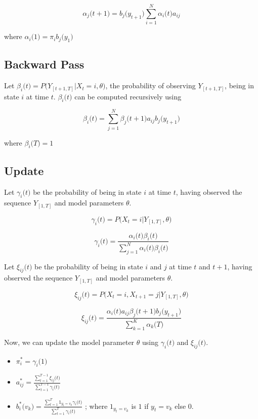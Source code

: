 \documentclass{article} %
\begin{document}
\[\alpha_j\big(t+1\big) = b_j\big(y_{t+1}\big)\sum_{i=1}^N\alpha_i\big(t\big)a_{ij}\]

where $\alpha_i\big(1\big) = \pi_ib_j\big(y_1\big)$

\subsection*{Backward Pass}
Let $\beta_i\big(t\big) = P\big(Y_{[t+1,T]}|X_t=i,\theta\big)$, the probability of observing  $Y_{[t+1,T]}$, being in state $i$ at time $t$. $\beta_i\big(t\big)$ can be computed recursively using

\[\beta_i\big(t\big) = \sum_{j=1}^N\beta_j\big(t+1\big)a_{ij}b_j\big(y_{t+1}\big) \]

where $\beta_i\big(T\big) = 1$

\subsection*{Update}
Let $\gamma_i\big(t\big)$ be the probability of being in state $i$ at time $t$, having observed the sequence $Y_{[1,T]}$ and model parameters $\theta$.

\[\gamma_i\big(t\big) = P\big( X_t=i|Y_{[1,T]},\theta\big)\]


\[\gamma_i\big(t\big) = \frac{\alpha_i\big(t\big) \beta_i\big(t\big)}{\sum_{j=1}^N \alpha_i\big(t\big) \beta_i\big(t\big) }\]

Let $\xi_{ij}\big(t\big)$ be the probability of being in state $i$ and $j$ at time $t$ and $t+1$, having observed the sequence $Y_{[1,T]}$ and model parameters $\theta$.

\[\xi_{ij}\big(t\big) = P\big( X_t=i,X_{t+1}=j|Y_{[1,T]},\theta\big)\]

\[\xi_{ij}\big(t\big) = \frac{\alpha_i\big(t\big)a_{ij}\beta_j\big(t+1\big)b_j\big(y_{t+1}\big)}{\sum_{k=1}^K \alpha_k\big(T\big)}\]

Now, we can update the model parameter $\theta$ using $\gamma_i\big(t\big)$ and $\xi_{ij}\big(t\big)$.
\begin{itemize}
\item \( \pi_i^* = \gamma_i\big(1\big) \)	
\item \( a_{ij}^* = \frac{\sum_{t=1}^{T-1}\xi_{ij}\big(t\big)}{\sum_{t=1}^{T-1}\gamma_{i}\big(t\big)} \)
\item \( b_i^*\big( v_k \big) = \frac{\sum_{t=1}^{T}1_{y_t=v_k}\gamma_{i}\big(t\big)}{\sum_{t=1}^{T}\gamma_{i}\big(t\big)}\)
;  where $1_{y_t=v_k}$ is $1$ if $y_t=v_k$ else $0$.
\end{itemize}
\end{document}
